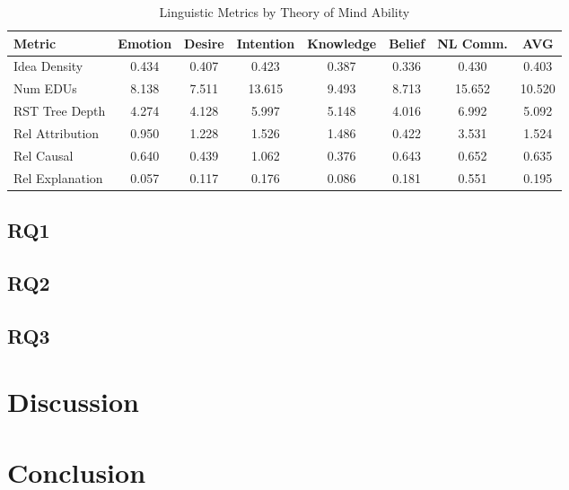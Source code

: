 \documentclass[11pt,a4paper]{article}
\begin{document}
\begin{table}[htbp]
\centering
\caption{Linguistic Metrics by Theory of Mind Ability}
\label{tab:linguistic_metrics}
\begin{tabular}{l|cccccc|c}
\toprule
\textbf{Metric} & \textbf{Emotion} & \textbf{Desire} & \textbf{Intention} & \textbf{Knowledge} & \textbf{Belief} & \textbf{NL Comm.} & \textbf{AVG} \\
\midrule
Idea Density & 0.434 & 0.407 & 0.423 & 0.387 & 0.336 & 0.430 & 0.403 \\
Num EDUs & 8.138 & 7.511 & 13.615 & 9.493 & 8.713 & 15.652 & 10.520 \\
RST Tree Depth & 4.274 & 4.128 & 5.997 & 5.148 & 4.016 & 6.992 & 5.092 \\
Rel Attribution & 0.950 & 1.228 & 1.526 & 1.486 & 0.422 & 3.531 & 1.524 \\
Rel Causal & 0.640 & 0.439 & 1.062 & 0.376 & 0.643 & 0.652 & 0.635 \\
Rel Explanation & 0.057 & 0.117 & 0.176 & 0.086 & 0.181 & 0.551 & 0.195 \\
\bottomrule
\end{tabular}
\end{table}

\subsection{RQ1}


\subsection{RQ2}


\subsection{RQ3}


\section{Discussion}


\section{Conclusion}







\end{document}
